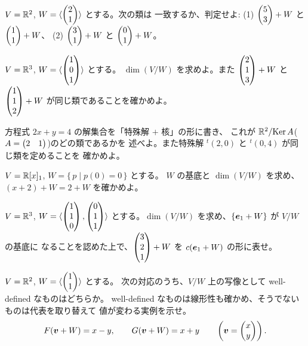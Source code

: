 \begin{mondai}[基本]\label{q:quot-ex1}
$V = \mathbb{R}^2$, $W = \langle \begin{pmatrix}2 \\ 1\end{pmatrix} \rangle$ とする。次の類は
一致するか、判定せよ:
(1) $\begin{pmatrix}5 \\ 3\end{pmatrix} + W$ と $\begin{pmatrix}1 \\ 1\end{pmatrix} + W$、
(2) $\begin{pmatrix}3 \\ 1\end{pmatrix} + W$ と $\begin{pmatrix}0 \\ 1\end{pmatrix} + W$。
\end{mondai}

\begin{mondai}[基本]\label{q:quot-ex2}
$V = \mathbb{R}^3$, $W = \langle \begin{pmatrix}1 \\ 0 \\ 1\end{pmatrix} \rangle$ とする。
$\dim(V/W)$ を求めよ。また $\begin{pmatrix}2 \\ 1 \\ 3\end{pmatrix} + W$ と
$\begin{pmatrix}1 \\ 1 \\ 2\end{pmatrix} + W$ が同じ類であることを確かめよ。
\end{mondai}

\begin{mondai}[基本]\label{q:quot-ex3}
方程式 $2x + y = 4$ の解集合を「特殊解 $+$ 核」の形に書き、
これが $\mathbb{R}^2/\mathrm{Ker}\,A$($A = \begin{pmatrix}2 & 1\end{pmatrix}$)のどの類であるかを
述べよ。また特殊解 ${}^t(2, 0)$ と ${}^t(0, 4)$ が同じ類を定めることを
確かめよ。
\end{mondai}

\begin{mondai}[基本]\label{q:quot-ex4}
$V = \mathbb{R}[x]_1$, $W = \{\, p \mid p(0) = 0 \,\}$ とする。
$W$ の基底と $\dim(V/W)$ を求め、$(x + 2) + W = 2 + W$ を確かめよ。
\end{mondai}

\begin{mondai}[標準]\label{q:quot-ex5}
$V = \mathbb{R}^3$, $W = \langle \begin{pmatrix}1 \\ 1 \\ 0\end{pmatrix}, \begin{pmatrix}0 \\ 1 \\ 1\end{pmatrix} \rangle$
とする。$\dim(V/W)$ を求め、$\{\bm{e}_1 + W\}$ が $V/W$ の基底に
なることを認めた上で、$\begin{pmatrix}3 \\ 2 \\ 1\end{pmatrix} + W$ を
$c(\bm{e}_1 + W)$ の形に表せ。
\end{mondai}

\begin{mondai}[標準]\label{q:quot-ex6}
$V = \mathbb{R}^2$, $W = \langle \begin{pmatrix}1 \\ 1\end{pmatrix} \rangle$ とする。
次の対応のうち、$V/W$ 上の写像として well-defined なものはどちらか。
well-defined なものは線形性も確かめ、そうでないものは代表を取り替えて
値が変わる実例を示せ。
\[
F(\bm{v} + W) = x - y, \qquad G(\bm{v} + W) = x + y
\qquad \left(\bm{v} = \begin{pmatrix}x \\ y\end{pmatrix}\right).
\]
\end{mondai}

